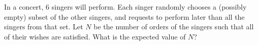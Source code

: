 In a concert, $6$ singers will perform. Each singer randomly chooses a (possibly empty) subset of the other singers, and requests to perform later than all the singers from that set. Let $N$ be the number of orders of the singers such that all of their wishes are satisfied. What is the expected value of $N$?
